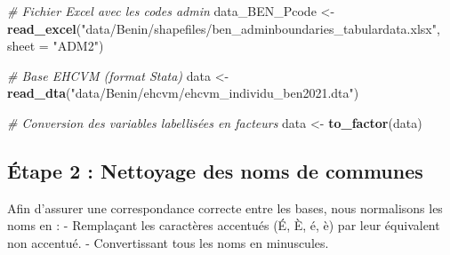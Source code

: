 \documentclass[
]{article}
\newenvironment{Shaded}{\begin{snugshade}}{\end{snugshade}}
\newcommand{\AttributeTok}[1]{\textcolor[rgb]{0.13,0.29,0.53}{#1}}
\newcommand{\CommentTok}[1]{\textcolor[rgb]{0.56,0.35,0.01}{\textit{#1}}}
\newcommand{\FunctionTok}[1]{\textcolor[rgb]{0.13,0.29,0.53}{\textbf{#1}}}
\newcommand{\NormalTok}[1]{#1}
\newcommand{\OtherTok}[1]{\textcolor[rgb]{0.56,0.35,0.01}{#1}}
\newcommand{\SpecialCharTok}[1]{\textcolor[rgb]{0.81,0.36,0.00}{\textbf{#1}}}
\newcommand{\StringTok}[1]{\textcolor[rgb]{0.31,0.60,0.02}{#1}}
\begin{document}
\begin{Shaded}
\begin{Highlighting}[]
\CommentTok{\# Fichier Excel avec les codes admin}
\NormalTok{data\_BEN\_Pcode }\OtherTok{\textless{}{-}} \FunctionTok{read\_excel}\NormalTok{(}\StringTok{"data/Benin/shapefiles/ben\_adminboundaries\_tabulardata.xlsx"}\NormalTok{, }
                             \AttributeTok{sheet =} \StringTok{"ADM2"}\NormalTok{)}

\CommentTok{\# Base EHCVM (format Stata)}
\NormalTok{data }\OtherTok{\textless{}{-}} \FunctionTok{read\_dta}\NormalTok{(}\StringTok{"data/Benin/ehcvm/ehcvm\_individu\_ben2021.dta"}\NormalTok{)}

\CommentTok{\# Conversion des variables labellisées en facteurs}
\NormalTok{data }\OtherTok{\textless{}{-}} \FunctionTok{to\_factor}\NormalTok{(data)}
\end{Highlighting}
\end{Shaded}

\hypertarget{uxe9tape-2-nettoyage-des-noms-de-communes}{%
\subsection{Étape 2 : Nettoyage des noms de
communes}\label{uxe9tape-2-nettoyage-des-noms-de-communes}}

Afin d'assurer une correspondance correcte entre les bases, nous
normalisons les noms en : - Remplaçant les caractères accentués (É, È,
é, è) par leur équivalent non accentué. - Convertissant tous les noms en
minuscules.

\begin{Shaded}
\end{Shaded}
\end{document}
